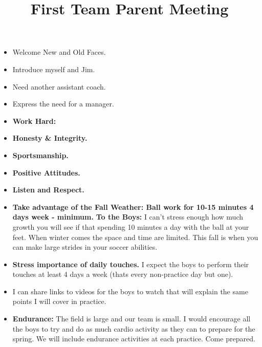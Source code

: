 \documentclass[10pt,letterpaper]{article}
\title{\vspace{-.5in}First Team Parent Meeting}
\author{\vspace{-.5in}}
\date{\vspace{-.5in}}
\newenvironment{agendablock}[1]{%
    \tcolorbox[beamer,%
    noparskip,breakable,
    colback=LightGray,colframe=Black,%
    colbacklower=Gray!75!LightGray,%
    title=#1]}%
    {\endtcolorbox}
\begin{document}
\selectfont
\maketitle

\begin{agendablock}{Welcome}
    \begin{itemize}
        \item Welcome New and Old Faces.
        \item Introduce myself and Jim.
        \item Need another assistant coach.
        \item Express the need for a manager.
    \end{itemize}
\end{agendablock}

\begin{agendablock}{Review Expectations of the Team and the Parents}
    \begin{itemize}
        \item \textbf{Work Hard:}
        \item \textbf{Honesty \& Integrity.}
        \item \textbf{Sportsmanship.}
        \item \textbf{Positive Attitudes.}
        \item \textbf{Listen and Respect.}
    \end{itemize}
\end{agendablock}

\begin{agendablock}{Player Work Outside of Practice}
    \begin{itemize}
        \item \textbf{Take advantage of the Fall Weather: Ball work for 10-15 minutes 4 days week - minimum.}  \textbf{To the Boys:} I can't stress enough how much growth you will see if that spending 10 minutes a day with the ball at your feet.  When winter comes the space and time are limited.  This fall is when you can make large strides in your soccer abilities.
        \item \textbf{Stress importance of daily touches.}  I expect the boys to perform their touches at least 4 days a week (thats every non-practice day but one).
        \item I can share links to videos for the boys to watch that will explain the same points I will cover in practice.
        \item \textbf{Endurance:} The field is large and our team is small.  I would encourage all the boys to try and do as much cardio activity as they can to prepare for the spring.  We will include endurance activities at each practice.  Come prepared.
    \end{itemize}
\end{agendablock}
\end{document}
